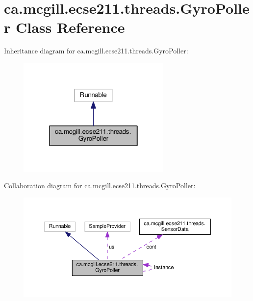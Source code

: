 \hypertarget{classca_1_1mcgill_1_1ecse211_1_1threads_1_1_gyro_poller}{}\section{ca.\+mcgill.\+ecse211.\+threads.\+Gyro\+Poller Class Reference}
\label{classca_1_1mcgill_1_1ecse211_1_1threads_1_1_gyro_poller}


Inheritance diagram for ca.\+mcgill.\+ecse211.\+threads.\+Gyro\+Poller\+:\nopagebreak
\begin{figure}[H]
\begin{center}
\leavevmode
\includegraphics[width=214pt]{classca_1_1mcgill_1_1ecse211_1_1threads_1_1_gyro_poller__inherit__graph}
\end{center}
\end{figure}


Collaboration diagram for ca.\+mcgill.\+ecse211.\+threads.\+Gyro\+Poller\+:\nopagebreak
\begin{figure}[H]
\begin{center}
\leavevmode
\includegraphics[width=350pt]{classca_1_1mcgill_1_1ecse211_1_1threads_1_1_gyro_poller__coll__graph}
\end{center}
\end{figure}
